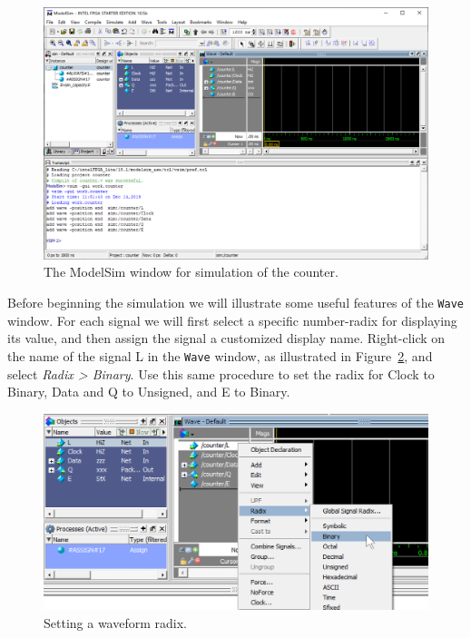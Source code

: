 \documentclass[11pt, twoside, pdftex]{article}
\begin{document}
\begin{figure}[H]
   \begin{center}
      \includegraphics[width=.95\textwidth]{figures/counter_main.png}
   \caption{The ModelSim window for simulation of the counter.} 
	 \label{fig:counter_main}
	 \end{center}
\end{figure}

Before beginning the simulation we will illustrate some useful features of the \texttt{Wave} window.
For each signal we will first select a specific number-radix for displaying its value, and 
then assign the signal a customized display name. Right-click on the name of the 
signal {\sf L} in the \texttt{Wave} 
window, as illustrated in Figure~\ref{fig:counter_radix}, and select {\it Radix > Binary}. Use 
this same procedure to set the radix for {\sf Clock} to {\sf Binary}, {\sf Data} and {\sf Q}
to {\sf Unsigned}, and {\sf E} to {\sf Binary}.

\begin{figure}[H]
   \begin{center}
      \includegraphics[scale=.75]{figures/counter_radix.png}
   \caption{Setting a waveform radix.} 
	 \label{fig:counter_radix}
	 \end{center}
\end{figure}
\end{document}
